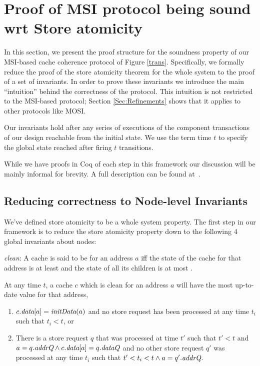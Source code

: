 \section{Proof of MSI protocol being sound wrt Store atomicity}
\label{safety}

In this section, we present the proof structure for the soundness property of our
MSI-based cache coherence protocol of Figure \ref{trans}. Specifically, we
formally reduce the proof of the store atomicity theorem for the whole system
to the proof of a set of invariants. In order to prove these invariants we
introduce the main ``intuition'' behind the correctness of the protocol. This
intuition is not restricted to the MSI-based protocol; Section
\ref{Sec:Refinements} shows that it applies to other protocols like MOSI.

Our invariants hold after any series of executions of the component
transactions of our design reachable from the initial state. We use
the term time $t$ to specify the global state reached after firing $t$
transitions.

While we have proofs in Coq of each step in this framework our
discussion will be mainly informal for brevity. A full description can
be found at~.

\subsection{Reducing correctness to Node-level Invariants}

We've defined store atomicity to be a whole system property. The first step in
our framework is to reduce the store atomicity property down to the following 4
global invariants about nodes:

\begin{defn}
\textit{clean}: A cache is said to be \clean{} for an address $a$ iff
the state of the cache for that address is at least \Sh{} and the
state of all its children is at most \Sh.
\end{defn}
\begin{inv}
At any time $t$, a cache $c$ which is clean for an address $a$ will have the most
up-to-date value for that address, \ie{}
\begin{enumerate}
\item $c.\textit{data}[a] = \textit{initData}(a)$ and no store request has been
  processed at any time $t_i$ such that $t_i < t$, or
\item There is a store request $q$ that was processed at time $t'$ such that
$t' < t$ and $a = q.\textit{addrQ} \wedge c.\textit{data}[a] = q.\textit{dataQ}$ and no other store
request $q'$ was processed at any time $t_i$ such that $t' < t_i < t \wedge a =
q'.\textit{addrQ}$.
\end{enumerate}
\label{latestValue}
\end{inv}


